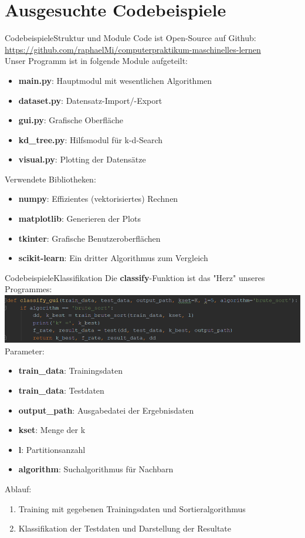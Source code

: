 \documentclass[9pt]{beamer}
\begin{document}
\section{Ausgesuchte Codebeispiele}
\begin{frame}{Codebeispiele}{Struktur und Module}
Code ist Open-Source auf Github: \url{https://github.com/raphaelMi/computerpraktikum-maschinelles-lernen}\\[0.4em]
Unser Programm ist in folgende Module aufgeteilt:
\begin{itemize}
\item{\textbf{main.py}: Hauptmodul mit wesentlichen Algorithmen}
\item{\textbf{dataset.py}: Datensatz-Import/-Export}
\item{\textbf{gui.py}: Grafische Oberfläche}
\item{\textbf{kd\_tree.py}: Hilfsmodul für k-d-Search}
\item{\textbf{visual.py}: Plotting der Datensätze}
\end{itemize}

Verwendete Bibliotheken:
\begin{itemize}
\item{\textbf{numpy}: Effizientes (vektorisiertes) Rechnen}
\item{\textbf{matplotlib}: Generieren der Plots}
\item{\textbf{tkinter}: Grafische Benutzeroberflächen}
\item{\textbf{scikit-learn}: Ein dritter Algorithmus zum Vergleich}
\end{itemize}
\end{frame}
\begin{frame}{Codebeispiele}{Klassifikation}
Die \textbf{classify}-Funktion ist das "Herz" unseres Programmes:
\includegraphics[scale=0.633]{assets/classify_brute.png}\\[0.4em]
Parameter:
\begin{itemize}
\item{\textbf{train\_data}: Trainingsdaten}
\item{\textbf{train\_data}: Testdaten}
\item{\textbf{output\_path}: Ausgabedatei der Ergebnisdaten}
\item{\textbf{kset}: Menge der k}
\item{\textbf{l}: Partitionsanzahl}
\item{\textbf{algorithm}: Suchalgorithmus für Nachbarn}
\end{itemize}
Ablauf:
\begin{enumerate}[1.]
\item{Training mit gegebenen Trainingsdaten und Sortieralgorithmus}
\item{Klassifikation der Testdaten und Darstellung der Resultate}
\end{enumerate}
\end{frame}
\end{document}
